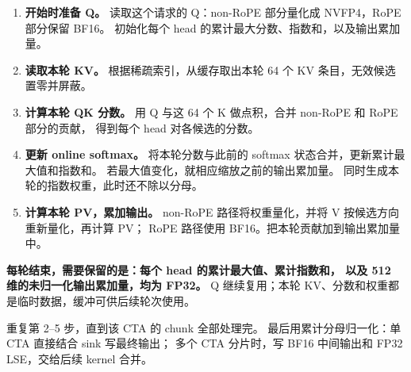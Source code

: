 \documentclass[UTF8,fontset=fandol,a4paper,10pt]{ctexart}
\begin{document}
\begin{enumerate}
  \item \textbf{开始时准备 Q。}
  读取这个请求的 Q：non-RoPE 部分量化成 NVFP4，RoPE 部分保留 BF16。
  初始化每个 head 的累计最大分数、指数和，以及输出累加量。

  \item \textbf{读取本轮 KV。}
  根据稀疏索引，从缓存取出本轮 64 个 KV 条目，无效候选置零并屏蔽。

  \item \textbf{计算本轮 QK 分数。}
  用 Q 与这 64 个 K 做点积，合并 non-RoPE 和 RoPE 部分的贡献，
  得到每个 head 对各候选的分数。

  \item \textbf{更新 online softmax。}
  将本轮分数与此前的 softmax 状态合并，更新累计最大值和指数和。
  若最大值变化，就相应缩放之前的输出累加量。
  同时生成本轮的指数权重，此时还不除以分母。

  \item \textbf{计算本轮 PV，累加输出。}
  non-RoPE 路径将权重量化，并将 V 按候选方向重新量化，再计算 PV；
  RoPE 路径使用 BF16。把本轮贡献加到输出累加量中。
\end{enumerate}

\textbf{每轮结束，需要保留的是：每个 head 的累计最大值、累计指数和，
以及 512 维的未归一化输出累加量，均为 FP32。}
Q 继续复用；本轮 KV、分数和权重都是临时数据，缓冲可供后续轮次使用。

重复第 2--5 步，直到该 CTA 的 chunk 全部处理完。
最后用累计分母归一化：单 CTA 直接结合 sink 写最终输出；
多个 CTA 分片时，写 BF16 中间输出和 FP32 LSE，交给后续 kernel 合并。
\end{document}

